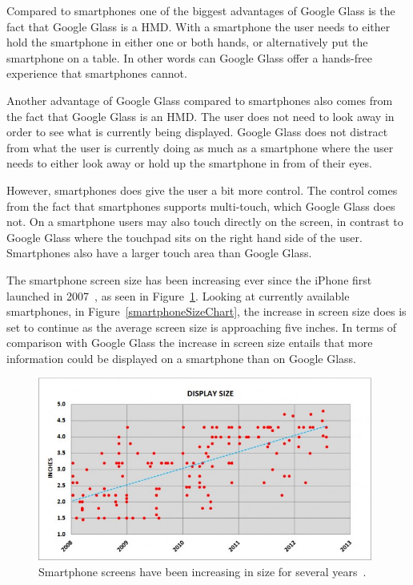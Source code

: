 Compared to smartphones one of the biggest advantages of Google Glass is the fact that Google Glass is a HMD. With a smartphone the user needs to either hold the smartphone in either one or both hands, or alternatively put the smartphone on a table. In other words can Google Glass offer a hands-free experience that smartphones cannot.

Another advantage of Google Glass compared to smartphones also comes from the fact that Google Glass is an HMD. The user does not need to look away in order to see what is currently being displayed. Google Glass does not distract from what the user is currently doing as much as a smartphone where the user needs to either look away or hold up the smartphone in from of their eyes.

However, smartphones does give the user a bit more control. The control comes from the fact that smartphones supports multi-touch, which Google Glass does not. On a smartphone users may also touch directly on the screen, in contrast to Google Glass where the touchpad sits on the right hand side of the user. Smartphones also have a larger touch area than Google Glass.

The smartphone screen size has been increasing ever since the iPhone first launched in 2007~\cite{iphoneWiki}, as seen in Figure~\ref{smartphoneSizeChart2}. Looking at currently available smartphones, in Figure~\ref{smartphoneSizeChart}, the increase in screen size does is set to continue as the average screen size is approaching five inches. In terms of comparison with Google Glass the increase in screen size entails that more information could be displayed on a smartphone than on Google Glass.

	\begin{figure}[ht!]
		\centering
		\includegraphics[width=110mm]{images/smartphoneSize2}
		\caption{Smartphone screens have been increasing in size for several years~\cite{smartphoneSizeChart2}.}
		\label{smartphoneSizeChart2}
	\end{figure}
	
